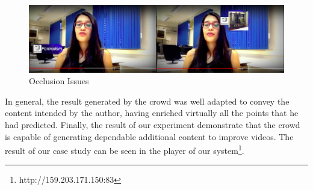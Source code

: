 \begin{figure}[h!]
	\centerline{\includegraphics[scale=0.19] {figure/occlusion}}
	\caption{Occlusion Issues}
	\label{oclusion}
\end{figure}

In general, the result generated by the crowd was well adapted to convey the content intended by the author, having enriched virtually all the points that he had predicted. Finally, the result of our experiment demonstrate that the crowd is capable of generating dependable additional content to improve videos. The result of our case study can be seen in the player of our system\footnote{http://159.203.171.150:83}.



















